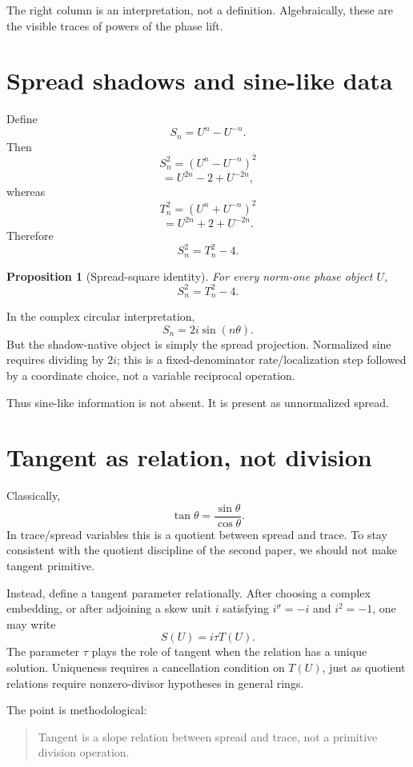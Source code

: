 \documentclass[11pt]{article}
\newtheorem{proposition}[definition]{Proposition}
\newcommand{\sig}{\sigma}
\begin{document}
The right column is an interpretation, not a definition.  Algebraically, these are the visible traces of powers of the phase lift.

\section{Spread shadows and sine-like data}

Define
\[
    S_n=U^n-U^{-n}.
\]
Then
\[
    S_n^2=(U^n-U^{-n})^2
\]
\[
    =U^{2n}-2+U^{-2n},
\]
whereas
\[
    T_n^2=(U^n+U^{-n})^2
\]
\[
    =U^{2n}+2+U^{-2n}.
\]
Therefore
\[
    S_n^2=T_n^2-4.
\]

\begin{proposition}[Spread-square identity]\label{prop:spread-square}
For every norm-one phase object $U$,
\[
    S_n^2=T_n^2-4.
\]
\end{proposition}

In the complex circular interpretation,
\[
    S_n=2i\sin(n\theta).
\]
But the shadow-native object is simply the spread projection.  Normalized sine requires dividing by $2i$; this is a fixed-denominator rate/localization step followed by a coordinate choice, not a variable reciprocal operation.

Thus sine-like information is not absent.  It is present as unnormalized spread.

\section{Tangent as relation, not division}

Classically,
\[
    \tan\theta=\frac{\sin\theta}{\cos\theta}.
\]
In trace/spread variables this is a quotient between spread and trace.  To stay consistent with the quotient discipline of the second paper, we should not make tangent primitive.

Instead, define a tangent parameter relationally.  After choosing a complex embedding, or after adjoining a skew unit $i$ satisfying $i^\sig=-i$ and $i^2=-1$, one may write
\[
    S(U)=i\tau T(U).
\]
The parameter $\tau$ plays the role of tangent when the relation has a unique solution.  Uniqueness requires a cancellation condition on $T(U)$, just as quotient relations require nonzero-divisor hypotheses in general rings.

The point is methodological:
\begin{quote}
Tangent is a slope relation between spread and trace, not a primitive division operation.
\end{quote}
\end{document}
